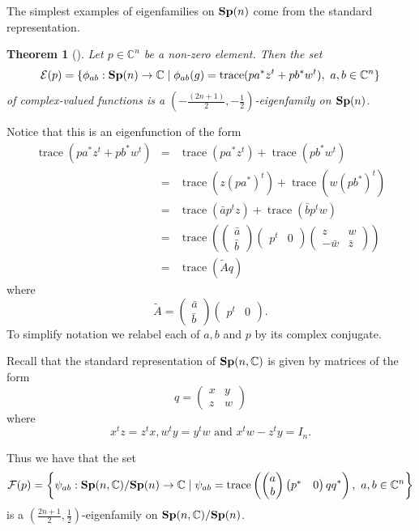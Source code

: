 \documentclass[11pt,reqno]{amsart}
\theoremstyle{plain}
\newtheorem{theorem}                 {Theorem}[section]
\theoremstyle{definition}
\numberwithin{equation}{section}
\def \cn{{\mathbb C}}
\def \E{\mathcal E}
\def \F{\mathcal F}
\def \Sp#1{\text{\bf Sp}(#1)}
\def \SpC#1{\text{\bf Sp}(#1,\cn)}
\DeclareMathOperator{\trace}{trace}
\numberwithin{equation}{section}
\begin{document}
The simplest examples of eigenfamilies on $\Sp{n}$ come from the standard representation.
\begin{theorem}[\cite{Gud-Sak-1}]
Let $p \in \cn^n$ be a non-zero element. Then the set 
	$$ \E(p) = \{ \phi_{ab} : \Sp{n} \to \cn \mid \phi_{ab}(g)= \trace (p a^* z^t+pb^*w^t), \ a,b\in \cn^n \}$$
	of complex-valued functions is a $(-\tfrac{(2n+1)}{2},-\tfrac{1}{2})$-eigenfamily on $\Sp{n}$.
\end{theorem}
Notice that this is an eigenfunction of the form 
\begin{eqnarray*}
\trace (p a^* z^t+pb^*w^t) &=& \trace (p a^* z^t) + \trace (pb^*w^t) \\
&=&  \trace (z (p a^*)^t) + \trace (w (pb^*)^t) \\
&=& \trace ( \bar ap^t z) + \trace (\bar bp^t w) \\
&=& \trace \left( \begin{pmatrix}
	\bar a \\ \bar b
\end{pmatrix} \begin{pmatrix}
p^t & 0
\end{pmatrix}  \begin{pmatrix}
z & w\\ -\bar w & \bar z
\end{pmatrix}\right)
 \\
&=& \trace (\tilde A q)
\end{eqnarray*}
where $$\tilde A = \begin{pmatrix}
	\bar a \\ \bar b
\end{pmatrix} \begin{pmatrix}
p^t & 0
\end{pmatrix} .$$
To simplify notation we relabel each of $a,b$ and $p$ by its complex conjugate.

Recall that the standard representation of $\SpC{n}$ is given by matrices of the form
$$ q=\begin{pmatrix}
	x & y \\
	z & w
\end{pmatrix}$$
where
\begin{equation}\label{eqn-Sp2nC}
	x^tz=z^tx,w^ty=y^tw \text{ and } x^tw-z^ty = I_n.
\end{equation}


Thus we have that the set \small
$$  \F(p) = \left\{ \psi_{ab}:\SpC{n}/\Sp{n} \to \cn \mid \psi_{ab} = \trace\left( \begin{pmatrix}
	a \\ b
\end{pmatrix} \begin{pmatrix}
p^* & 0
\end{pmatrix}  q q^*\right), \ a,b \in \cn^n
\right\} $$ \normalsize
is a $(\tfrac{2n+1}{2},\tfrac{1}{2})$-eigenfamily on $\SpC{n}/\Sp{n}$.
\end{document}
